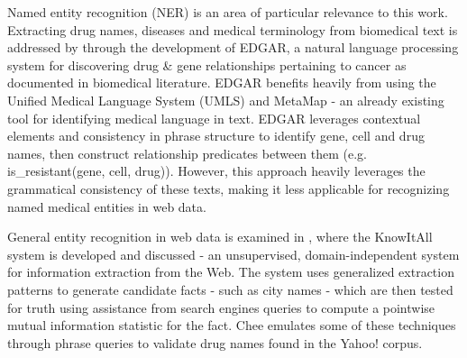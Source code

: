 \documentclass[twoside,11pt]{article}
\begin{document}
Named entity recognition (NER) is an area of particular relevance to this work. Extracting drug names, diseases and medical terminology from biomedical text
is addressed by \citep{Rindflesch} through the development of EDGAR, a natural language processing system for discovering drug & gene relationships pertaining to cancer as documented in biomedical literature. EDGAR benefits heavily from using the Unified Medical Language System (UMLS) and MetaMap \citep{Metamap} - an already existing tool for identifying medical language in text. EDGAR leverages contextual elements and consistency in phrase structure to identify gene, cell and drug names, then construct relationship predicates between them (e.g. is\_resistant(gene, cell, drug)). However, this approach heavily leverages the grammatical consistency of these texts, making it less applicable for recognizing named medical entities in web data.

General entity recognition in web data is examined in \citep{Etzioni}, where the KnowItAll system is developed and discussed - an unsupervised, domain-independent system for information extraction from the Web. The system uses generalized extraction patterns to generate candidate facts - such as city names - which are then tested for truth using assistance from search engines queries to compute a pointwise mutual information statistic for the fact. Chee emulates some of these techniques through phrase queries to validate drug names found in the Yahoo! corpus.
\end{document}

